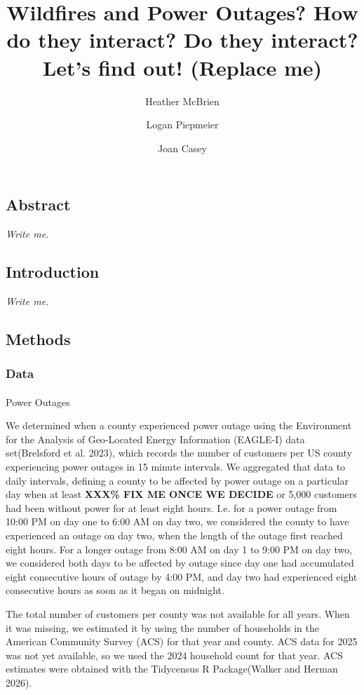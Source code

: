 \documentclass[
  letterpaper,
  DIV=11,
  numbers=noendperiod]{scrartcl}
\title{Wildfires and Power Outages? How do they interact? Do they
interact? Let's find out! (Replace me)}
\author{Heather McBrien \and Logan Piepmeier \and Joan Casey}
\date{}
\makeatletter
\let\oldparagraph\paragraph
\renewcommand{\paragraph}{
    \@ifstar
      \xxxParagraphStar
      \xxxParagraphNoStar
  }
\newcommand{\xxxParagraphStar}[1]{\oldparagraph*{#1}\mbox{}}
\newcommand{\xxxParagraphNoStar}[1]{\oldparagraph{#1}\mbox{}}
\makeatother
\begin{document}
\maketitle


\subsection{Abstract}\label{abstract}

\emph{Write me.}

\subsection{Introduction}\label{introduction}

\emph{Write me.}

\subsection{Methods}\label{methods}

\subsubsection{Data}\label{data}

\paragraph{Power Outages}\label{power-outages}

We determined when a county experienced power outage using the
Environment for the Analysis of Geo-Located Energy Information (EAGLE-I)
data set(Brelsford et al. 2023), which records the number of customers
per US county experiencing power outages in 15 minute intervals. We
aggregated that data to daily intervals, defining a county to be
affected by power outage on a particular day when at least \textbf{XXX\%
FIX ME ONCE WE DECIDE} or 5,000 customers had been without power for at
least eight hours. I.e. for a power outage from 10:00 PM on day one to
6:00 AM on day two, we considered the county to have experienced an
outage on day two, when the length of the outage first reached eight
hours. For a longer outage from 8:00 AM on day 1 to 9:00 PM on day two,
we considered both days to be affected by outage since day one had
accumulated eight consecutive hours of outage by 4:00 PM, and day two
had experienced eight consecutive hours as soon as it began on midnight.

The total number of customers per county was not available for all
years. When it was missing, we estimated it by using the number of
households in the American Community Survey (ACS) for that year and
county. ACS data for 2025 was not yet available, so we used the 2024
household count for that year. ACS estimates were obtained with the
Tidycensus R Package(Walker and Herman 2026).
\end{document}
